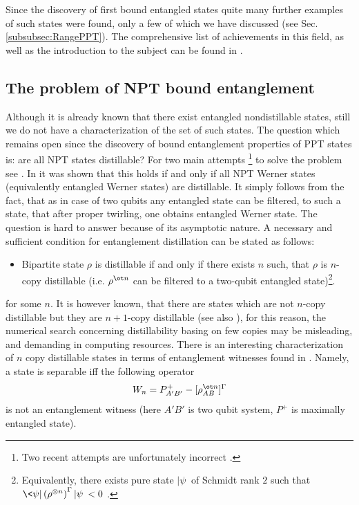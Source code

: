 \documentclass[twocolumn,aps,rmp]{revtex4}
\begin{document}
Since the discovery of first bound entangled states quite many further
examples of such states were found, only a few of which we have
discussed (see Sec. \ref{subsubsec:RangePPT}). The comprehensive list
of achievements in this field, as well as the introduction to the
subject can be found in \cite{ClarissePhd}.

\subsection{The problem of NPT bound entanglement}

Although it is already known that there exist entangled nondistillable
states, still we do not have a characterization of the set of such
states. The question which remains open since the discovery of bound
entanglement properties of PPT states is: are all NPT states
distillable? For two main attempts \footnote{Two recent attempts are
  unfortunately incorrect \cite{ChattoSarkar,SimonNPTbound}.} to solve
the problem see
\cite{DiVincenzoSSTT1999-nptbound,DurCLB1999-npt-bound}. In
\cite{reduction} it was shown that this holds if and only if all NPT
Werner states (equivalently entangled Werner states) are
distillable. It simply follows from the fact, that as in case of two
qubits any entangled state can be filtered, to such a state, that
after proper twirling, one obtains entangled Werner state. The
question is hard to answer because of its asymptotic nature. A
necessary and sufficient condition for entanglement distillation
\cite{bound} can be stated as follows:
\begin{itemize}
\item Bipartite state $\rho$ is distillable if and only if there
  exists $n$ such, that $\rho$ is $n$-copy distillable
  (i.e. $\rho^{\ot n}$ can be filtered to a two-qubit entangled
  state)\footnote{Equivalently, there exists pure state $|\psi\>$ of
    Schmidt rank $2$ such that $\<\psi|\left(\rho^{\otimes
        n}\right)^\Gamma|\psi\><0$
    \cite{DiVincenzoSSTT1999-nptbound,DurCLB1999-npt-bound}.}.
\end{itemize}
for some $n$.  It is however known, that there are states which are
not $n$-copy distillable but they are $n+1$-copy distillable
\cite{Watrous2003-n-dist} (see also
\cite{Bandyopadhyay2003-n-distil}), for this reason, the numerical
search concerning distillability basing on few copies may be
misleading, and demanding in computing resources. There is an
interesting characterization of $n$ copy distillable states in terms
of entanglement witnesses found in \cite{KrausLC}. Namely, a state is
separable iff the following operator
\begin{equation}
W_n= P^+_{A'B'} - [\rho_{AB}^{\ot n}]^\Gamma
\end{equation}
is not an entanglement witness (here $A'B'$ is two qubit system, $P^+$
is maximally entangled state).
\end{document}
